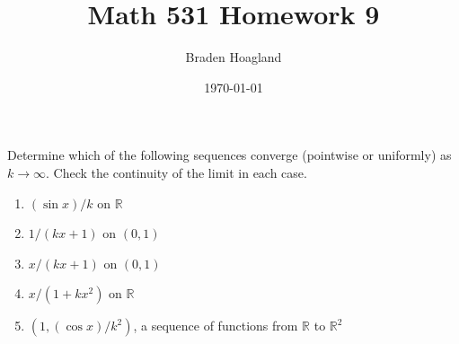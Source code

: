\documentclass[10pt]{amsart}
\newenvironment{exercise}[1]{%
        \vspace{10mm}
        \renewcommand\themanualtheoreminner{#1}%
  \manualtheoreminner
}\hrulefill{\endmanualtheoreminner}
\begin{document}
\title{Math 531 Homework 9}
\author{Braden Hoagland}
\date{\today}
\maketitle

\begin{exercise}{Page 316, Ex. 2}
	Determine which of the following sequences converge (pointwise or uniformly) as $k \to \infty$. Check the continuity of the limit in each case.
	\begin{enumerate}
		\item $(\sin x)/k$ on $\mathbb{R}$ 
		\item $1/(kx+1)$ on $(0,1)$ 
		\item $x/(kx+1)$ on $(0,1)$ 
		\item $x/(1+kx^2)$ on $\mathbb{R}$ 
		\item $(1, (\cos x)/k^2)$, a sequence of functions from $\mathbb{R}$ to $\mathbb{R}^2$
	\end{enumerate}
\end{exercise}
\end{document}

